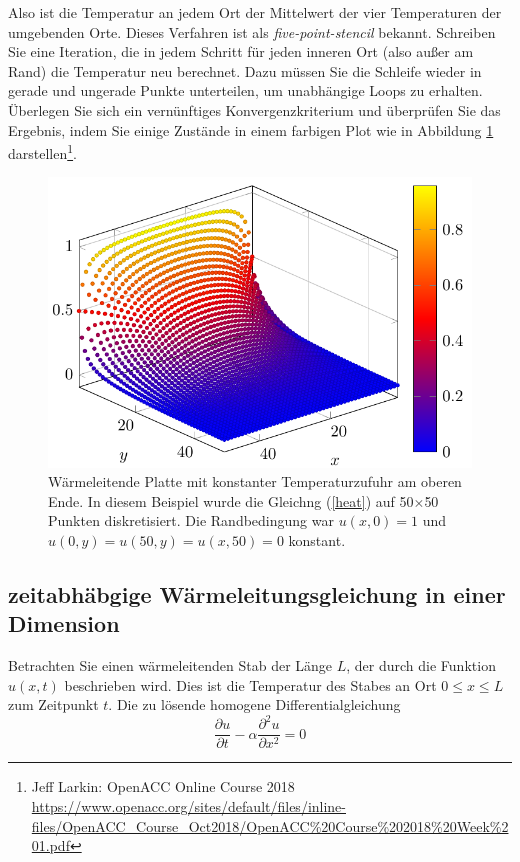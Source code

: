 \documentclass[headsepline=3pt,headinclude=true,12pt,oneside]{scrartcl}
\begin{document}
	Also ist die Temperatur an jedem Ort der Mittelwert der vier Temperaturen der umgebenden Orte. Dieses Verfahren ist als \textit{five-point-stencil} bekannt.
	Schreiben Sie eine Iteration, die in jedem Schritt für jeden inneren Ort (also außer am Rand) die Temperatur neu berechnet. Dazu müssen Sie die Schleife wieder in gerade und ungerade Punkte unterteilen, um unabhängige Loops zu erhalten. Überlegen Sie sich ein vernünftiges Konvergenzkriterium und überprüfen Sie das Ergebnis, indem Sie einige Zustände in einem farbigen Plot wie in Abbildung \ref{platte} darstellen\footnote{Jeff Larkin: OpenACC Online Course 2018\\ \url{https://www.openacc.org/sites/default/files/inline-files/OpenACC_Course_Oct2018/OpenACC\%20Course\%202018\%20Week\%201.pdf}}.
	\begin{figure}[h]
		\centering
		\includegraphics[scale=0.5]{platte.png}
		\caption{Wärmeleitende Platte mit konstanter Temperaturzufuhr am oberen Ende. In diesem Beispiel wurde die Gleichng (\ref{heat}) auf 50$\times$50 Punkten diskretisiert. Die Randbedingung war $u(x,0) = 1$ und $u(0,y) = u(50,y) = u(x,50) = 0$ konstant.}
		\label{platte}		
	\end{figure}
	
	\subsection{zeitabhäbgige Wärmeleitungsgleichung in einer Dimension}
	Betrachten Sie einen wärmeleitenden Stab der Länge $L$, der durch die Funktion $u(x,t)$ beschrieben wird. Dies ist die Temperatur des Stabes an Ort $0\leq x \leq L$ zum Zeitpunkt $t$. Die zu lösende homogene Differentialgleichung
	\begin{equation}\label{diff}
		\frac{\partial u}{\partial t} - \alpha\frac{\partial^2 u}{\partial x^2} = 0
	\end{equation}
	
\end{document}
